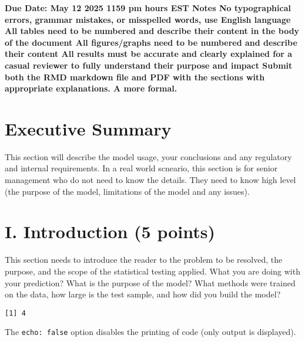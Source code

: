 \documentclass[
  letterpaper,
  DIV=11,
  numbers=noendperiod]{scrartcl}
\begin{document}
\textbf{Due Date: May 12 2025 1159 pm hours EST Notes No typographical
errors, grammar mistakes, or misspelled words, use English language All
tables need to be numbered and describe their content in the body of the
document All figures/graphs need to be numbered and describe their
content All results must be accurate and clearly explained for a casual
reviewer to fully understand their purpose and impact Submit both the
RMD markdown file and PDF with the sections with appropriate
explanations. A more formal.}

\section{Executive Summary}\label{executive-summary}

This section will describe the model usage, your conclusions and any
regulatory and internal requirements. In a real world scneario, this
section is for senior management who do not need to know the details.
They need to know high level (the purpose of the model, limitations of
the model and any issues).

\section{I. Introduction (5 points)}\label{i.-introduction-5-points}

This section needs to introduce the reader to the problem to be
resolved, the purpose, and the scope of the statistical testing applied.
What you are doing with your prediction? What is the purpose of the
model? What methods were trained on the data, how large is the test
sample, and how did you build the model?

\begin{verbatim}
[1] 4
\end{verbatim}

The \texttt{echo:\ false} option disables the printing of code (only
output is displayed).
\end{document}
